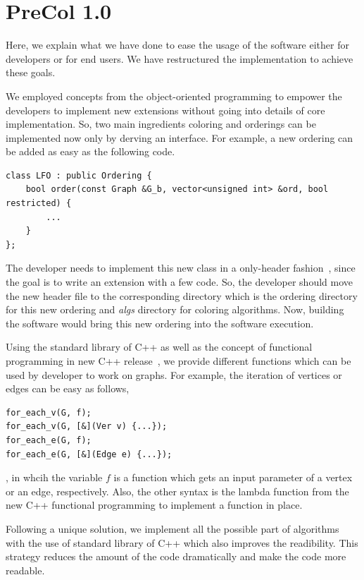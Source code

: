 \documentclass[12pt, oneside]{book}
\begin{document}
\section{PreCol 1.0}%
\label{s.extend}
Here, we explain what we have done to ease the usage of the software
either for developers or for end users. We have restructured the implementation
to achieve these goals. 

We employed concepts from the object-oriented programming to empower
the developers to implement new extensions without going into 
details of core implementation. So, two main ingredients coloring
and orderings can be implemented now only by derving an interface.
For example, a new ordering can be added as easy as the following code.
\begin{lstlisting}
class LFO : public Ordering {
    bool order(const Graph &G_b, vector<unsigned int> &ord, bool restricted) {
        ...
    }
};
\end{lstlisting}
The developer needs to implement this new class in a only-header fashion~\cite{headeronly},
since the goal is to write an extension with a few code. So, the developer should
move the new header file to the corresponding directory which is the ordering directory
for this new ordering and \textit{algs} directory for coloring algorithms.
Now, building the software would bring this new ordering into the software execution.

Using the standard library of C++ as well as the concept of functional programming
in new C++ release~\cite{Sutherland2015}, we provide different functions which can be used
by developer to work on graphs. For example, the iteration of vertices
or edges can be easy as follows,
\begin{lstlisting}
for_each_v(G, f);
for_each_v(G, [&](Ver v) {...});
for_each_e(G, f);
for_each_e(G, [&](Edge e) {...});
\end{lstlisting}
, in whcih the variable $f$ is a function which gets an input parameter
of a vertex or an edge, respectively.
Also, the other syntax is the lambda function 
from the new C++ functional programming to implement a function in place.

Following a unique solution, we implement all the possible part of algorithms
with the use of standard library of C++ which also improves the readibility.
This strategy reduces the amount of the code dramatically and
make the code more readable.
\end{document}
